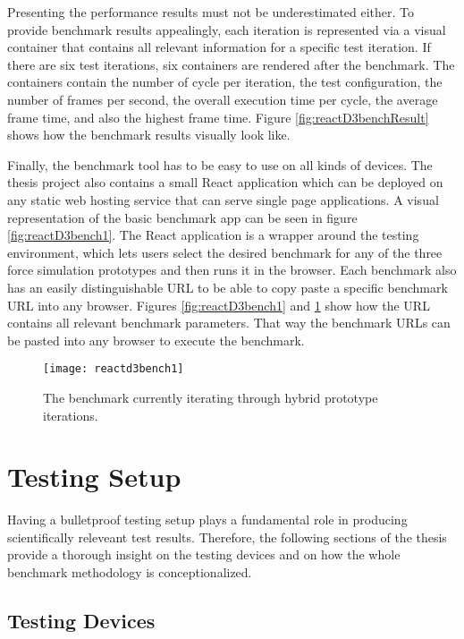 Presenting the performance results must not be underestimated either. To provide benchmark results appealingly, each iteration is represented via a visual container that contains all relevant information for a specific test iteration. If there are six test iterations, six containers are rendered after the benchmark. The containers contain the number of cycle per iteration, the test configuration, the number of frames per second, the overall execution time per cycle, the average frame time, and also the highest frame time. Figure \ref{fig:reactD3benchResult} shows how the benchmark results visually look like.

Finally, the benchmark tool has to be easy to use on all kinds of devices. The thesis project also contains a small React application which can be deployed on any static web hosting service that can serve single page applications. A visual representation of the basic benchmark app can be seen in figure \ref{fig:reactD3bench1}. The React application is a wrapper around the testing environment, which lets users select the desired benchmark for any of the three force simulation prototypes and then runs it in the browser. Each benchmark also has an easily distinguishable URL to be able to copy paste a specific benchmark URL into any browser. Figures \ref{fig:reactD3bench1} and \ref{fig:reactD3bench2} show how the URL contains all relevant benchmark parameters. That way the benchmark URLs can be pasted into any browser to execute the benchmark. 

\begin{figure}
  \centering
  \texttt{[image: reactd3bench1]}
  \caption{The benchmark currently iterating through hybrid prototype iterations.}
  \label{fig:reactD3bench2}
\end{figure}

\section{Testing Setup}

Having a bulletproof testing setup plays a fundamental role in producing scientifically releveant test results. Therefore, the following sections of the thesis provide a thorough insight on the testing devices and on how the whole benchmark methodology is conceptionalized. 

\subsection{Testing Devices}

